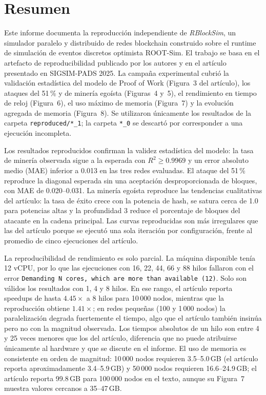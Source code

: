 \documentclass[11pt,a4paper,oneside]{article}
\begin{document}
\section*{Resumen}

Este informe documenta la reproducción independiente de \emph{RBlockSim}, un simulador paralelo y distribuido de redes blockchain construido sobre el runtime de simulación de eventos discretos optimista ROOT-Sim. El trabajo se basa en el artefacto de reproducibilidad publicado por los autores y en el artículo presentado en SIGSIM-PADS 2025. La campaña experimental cubrió la validación estadística del modelo de Proof of Work (Figura~3 del artículo), los ataques del 51\,\% y de minería egoísta (Figuras~4 y~5), el rendimiento en tiempo de reloj (Figura~6), el uso máximo de memoria (Figura~7) y la evolución agregada de memoria (Figura~8). Se utilizaron únicamente los resultados de la carpeta \texttt{reproduced/*\_1}; la carpeta \texttt{*\_0} se descartó por corresponder a una ejecución incompleta.

Los resultados reproducidos confirman la validez estadística del modelo: la tasa de minería observada sigue a la esperada con $R^2 \ge 0.9969$ y un error absoluto medio (MAE) inferior a 0.013 en las tres redes evaluadas. El ataque del 51\,\% reproduce la diagonal esperada sin una aceptación desproporcionada de bloques, con MAE de 0.020--0.031. La minería egoísta reproduce las tendencias cualitativas del artículo: la tasa de éxito crece con la potencia de hash, se satura cerca de 1.0 para potencias altas y la profundidad 3 reduce el porcentaje de bloques del atacante en la cadena principal. Las curvas reproducidas son más irregulares que las del artículo porque se ejecutó una sola iteración por configuración, frente al promedio de cinco ejecuciones del artículo.

La reproducibilidad de rendimiento es solo parcial. La máquina disponible tenía 12 vCPU, por lo que las ejecuciones con 16, 22, 44, 66 y 88 hilos fallaron con el error \texttt{Demanding N cores, which are more than available (12)}. Solo son válidos los resultados con 1, 4 y 8 hilos. En ese rango, el artículo reporta speedups de hasta $4.45\times$ a 8 hilos para 10\,000 nodos, mientras que la reproducción obtiene $1.41\times$; en redes pequeñas (100 y 1\,000 nodos) la paralelización degrada fuertemente el tiempo, algo que el artículo también insinúa pero no con la magnitud observada. Los tiempos absolutos de un hilo son entre 4 y 25 veces menores que los del artículo, diferencia que no puede atribuirse únicamente al hardware y que se discute en el informe. El uso de memoria es consistente en orden de magnitud: 10\,000 nodos requieren 3.5--5.0\,GB (el artículo reporta aproximadamente 3.4--5.9\,GB) y 50\,000 nodos requieren 16.6--24.9\,GB; el artículo reporta 99.8\,GB para 100\,000 nodos en el texto, aunque su Figura~7 muestra valores cercanos a 35--47\,GB.
\end{document}
